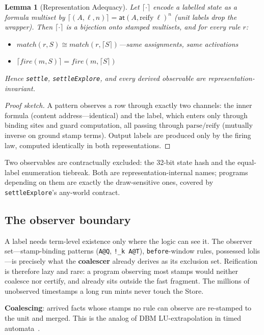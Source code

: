 \documentclass[11pt]{article}
\newcommand{\enc}[1]{\lceil #1 \rceil}
\newtheorem{lemma}[theorem]{Lemma}
\theoremstyle{remark}
\begin{document}
\begin{lemma}[Representation Adequacy]
\label{lem:rep-adequacy}
Let $\enc{\cdot}$ encode a labelled state as a formula multiset by
$\enc{(A, \ell, n)} = \mathsf{at}(A, \mathrm{reify}\ \ell)^n$ (unit labels drop
the wrapper).  Then $\enc{\cdot}$ is a bijection onto stamped multisets, and for
every rule $r$:
\begin{itemize}
\item $\mathit{match}(r, S) \cong \mathit{match}(r, \enc{S})$---same
  assignments, same activations
\item $\enc{\mathit{fire}(m, S)} = \mathit{fire}(m, \enc{S})$
\end{itemize}
Hence \texttt{settle}, \texttt{settleExplore}, and every derived observable are
representation-invariant.
\end{lemma}

\begin{proof}[Proof sketch]
A pattern observes a row through exactly two channels: the inner formula (content
address---identical) and the label, which enters only through binding sites and
guard computation, all passing through $\mathrm{parse}/\mathrm{reify}$ (mutually
inverse on ground stamp terms).  Output labels are produced only by the firing
law, computed identically in both representations.
\end{proof}

Two observables are contractually excluded: the 32-bit state hash and the
equal-label enumeration tiebreak.  Both are representation-internal names;
programs depending on them are exactly the draw-sensitive ones, covered by
\texttt{settleExplore}'s any-world contract.

\subsection{The observer boundary}
\label{sec:observer-boundary}

A label needs term-level existence only where the logic can see it.  The observer
set---stamp-binding patterns (\texttt{A@Q}, \texttt{!\_k A@T}),
\texttt{before}-window rules, possessed lolis---is precisely what the
\textbf{coalescer} already derives as its exclusion set.  Reification is therefore
lazy and rare: a program observing most stamps would neither coalesce nor certify,
and already sits outside the fast fragment.  The millions of unobserved timestamps
a long run mints never touch the Store.

\textbf{Coalescing}: arrived facts whose stamps no rule can observe are
re-stamped to the unit and merged.  This is the analog of DBM LU-extrapolation
in timed automata~\cite{BengtssonYi04}.
\end{document}
